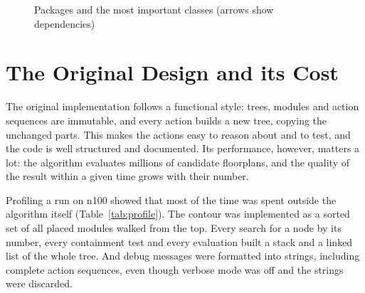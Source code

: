 \begin{figure}
\centering
{}
\caption{Packages and the most important classes (arrows show dependencies)}
\label{fig:packages}
\end{figure}

\section{The Original Design and its Cost}

The original implementation follows a functional style: trees, modules and action sequences are immutable, and every action builds a new tree, copying the unchanged parts. This makes the actions easy to reason about and to test, and the code is well structured and documented. Its performance, however, matters a lot: the algorithm evaluates millions of candidate floorplans, and the quality of the result within a given time grows with their number.

Profiling a run on n100 showed that most of the time was spent outside the algorithm itself (Table~\ref{tab:profile}). The contour was implemented as a sorted set of all placed modules walked from the top. Every search for a node by its number, every containment test and every evaluation built a stack and a linked list of the whole tree. And debug messages were formatted into strings, including complete action sequences, even though verbose mode was off and the strings were discarded.

